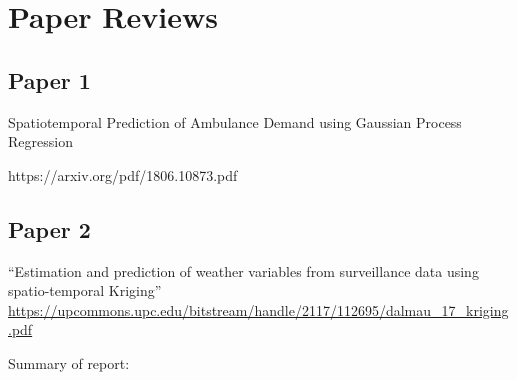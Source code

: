 






\section{Paper Reviews}


\subsection{Paper 1}

Spatiotemporal Prediction of Ambulance Demand using Gaussian Process Regression

https://arxiv.org/pdf/1806.10873.pdf




\subsection{Paper 2}
“Estimation and prediction of weather variables from surveillance data using spatio-temporal Kriging”\\ \url{https://upcommons.upc.edu/bitstream/handle/2117/112695/dalmau_17_kriging.pdf}

Summary of report:



